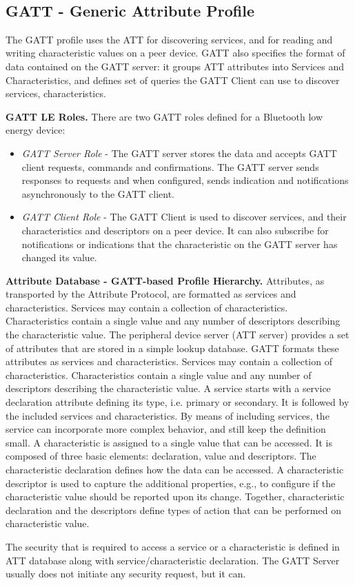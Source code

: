  \\

\subsection{GATT - Generic Attribute Profile}
The GATT profile uses the ATT for discovering services, and for reading and writing characteristic values on a peer device. GATT also specifies the format of data contained on the GATT server: it groups ATT attributes into Services and Characteristics, and defines set of queries the GATT Client can use to discover services, characteristics.

\textbf{GATT LE Roles.}
There are two GATT roles defined for a Bluetooth low energy device:
\begin{itemize}
\item \emph{GATT Server Role} - The GATT server stores the data and accepts GATT client requests, commands and confirmations. The GATT server sends responses to requests and when configured, sends indication and notifications asynchronously to the GATT client. 
\item \emph{GATT Client Role} - The GATT Client is used to discover services, and their characteristics and descriptors on a peer device. It can also subscribe for notifications or indications that the characteristic on the GATT server has changed its value. 
\end{itemize}

\textbf{Attribute Database - GATT-based Profile Hierarchy.}
Attributes, as transported by the Attribute Protocol, are formatted as services and characteristics. Services may contain a collection of characteristics. Characteristics contain a single value and any number of descriptors describing the characteristic value. The peripheral device server (ATT server) provides a set of attributes that are stored in a simple lookup database. GATT formats these attributes as services and characteristics. Services may contain a collection of characteristics. Characteristics contain a single value and any number of descriptors describing the characteristic value. A service starts with a service declaration attribute defining its type, i.e. primary or secondary. It is followed by the included services and characteristics. By means of including services, the service can incorporate more complex behavior, and still keep the definition small. A characteristic is assigned to a single value that can be accessed. It is composed of three basic elements: declaration, value and descriptors. The characteristic declaration defines how the data can be accessed. A characteristic descriptor is used to capture the additional properties, e.g., to configure if the characteristic value should be reported upon its change. Together, characteristic declaration and the descriptors define types of action that can be performed on characteristic value.

The security that is required to access a service or a characteristic is defined in ATT database along with service/characteristic declaration. The GATT Server usually does not initiate any security request, but it can. 


